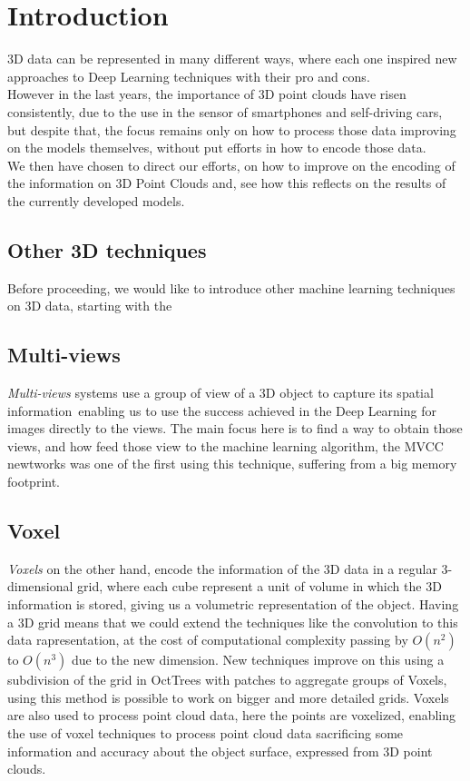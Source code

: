 \documentclass[12pt]{article}
\begin{document}
\tableofcontents
\clearpage

\section{Introduction}
3D data can be represented in many different ways, 
where each one inspired new approaches to Deep Learning techniques with their pro and cons.
\\
However in the last years, the importance of 3D point clouds have risen consistently, 
due to the use in the sensor of smartphones and self-driving cars, 
but despite that, the focus remains only on how to process those data improving on the models themselves, 
without put efforts in how to encode those data.
\\
We then have chosen to direct our efforts, 
on how to improve on the encoding of the information on 3D Point Clouds and, 
see how this reflects on the results of the currently developed models.

\subsection{Other 3D techniques}
Before proceeding, we would like to introduce other machine learning techniques on 3D data, 
starting with the 

\subsection{Multi-views}
\textit{Multi-views} systems use a group of view of a 3D object to capture its spatial information\, 
enabling us to use the success achieved in the Deep Learning for images directly to the views. 
The main focus here is to find a way to obtain those views, 
and how feed those view to the machine learning algorithm, 
the MVCC\cite{su15mvcnn} newtworks was one of the first using this technique, suffering from a big memory footprint.

\subsection{Voxel}
\textit{Voxels} on the other hand, 
encode the information of the 3D data in a regular 3-dimensional grid, where each cube represent a unit of volume in which the 3D information is stored, giving us a volumetric representation of the object.
Having a 3D grid means that we could extend the techniques like the convolution to this data rapresentation\cite{7353481}, 
at the cost of computational complexity passing by $ O(n^2) $ to $ O(n^3) $ due to the new dimension. New techniques improve on this using a subdivision of the grid in OctTrees with patches to aggregate groups of Voxels\cite{Wang-2017-ocnn}, using this method is possible to work on bigger and more detailed grids.
Voxels are also used to process point cloud data, here the points are voxelized, enabling the use of voxel techniques to process point cloud data sacrificing some information and accuracy about the object surface, expressed from 3D point clouds.
\end{document}
